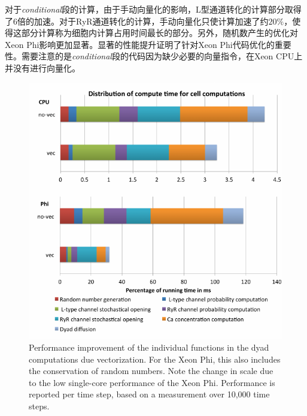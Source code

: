 对于\textit{conditional}段的计算，由于手动向量化的影响，L型通道转化的计算部分取得了6倍的加速。对于RyR通道转化的计算，手动向量化只使计算加速了约$20\%$，使得这部分计算称为细胞内计算占用时间最长的部分。另外，随机数产生的优化对Xeon Phi影响更加显著。显著的性能提升证明了针对Xeon Phi代码优化的重要性。需要注意的是\textit{conditional}段的代码因为缺少必要的向量指令，在Xeon CPU上并没有进行向量化。

\begin{figure}[htb]
\includegraphics[width=\linewidth]{figs/perf1crop.pdf}
\caption{Performance improvement of the individual functions in the dyad computations due vectorization. For the Xeon Phi, this also includes the conservation of random numbers.
Note the change in scale due to the low single-core performance of the Xeon Phi. Performance is reported per time step, based on a measurement over 10,000 time steps.}
\label{fig:optimizations}
\end{figure}


